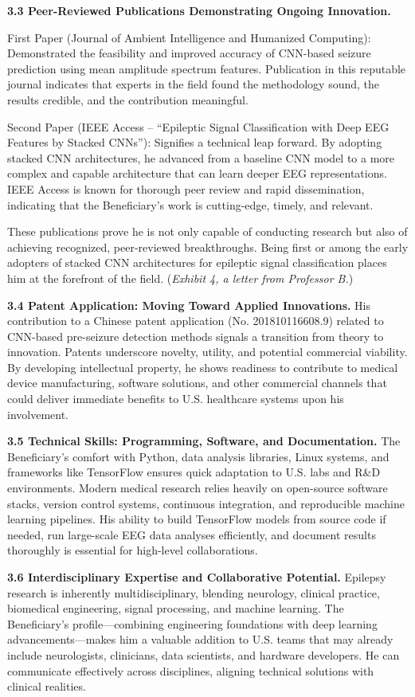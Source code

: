 \documentclass{article}
\begin{document}
{\bf 3.3 Peer-Reviewed Publications Demonstrating Ongoing Innovation.}

First Paper (Journal of Ambient Intelligence and Humanized Computing):
Demonstrated the feasibility and improved accuracy of CNN-based seizure prediction using mean amplitude spectrum features. Publication in this reputable journal indicates that experts in the field found the methodology sound, the results credible, and the contribution meaningful.

Second Paper (IEEE Access – “Epileptic Signal Classification with Deep EEG Features by Stacked CNNs”):
Signifies a technical leap forward. By adopting stacked CNN architectures, he advanced from a baseline CNN model to a more complex and capable architecture that can learn deeper EEG representations. IEEE Access is known for thorough peer review and rapid dissemination, indicating that the Beneficiary’s work is cutting-edge, timely, and relevant.

These publications prove he is not only capable of conducting research but also of achieving recognized, peer-reviewed breakthroughs. Being first or among the early adopters of stacked CNN architectures for epileptic signal classification places him at the forefront of the field. ({\it Exhibit 4, a letter from Professor B.})

{\bf 3.4 Patent Application: Moving Toward Applied Innovations.}
His contribution to a Chinese patent application (No. 201810116608.9) related to CNN-based pre-seizure detection methods signals a transition from theory to innovation. Patents underscore novelty, utility, and potential commercial viability. By developing intellectual property, he shows readiness to contribute to medical device manufacturing, software solutions, and other commercial channels that could deliver immediate benefits to U.S. healthcare systems upon his involvement.


{\bf 3.5 Technical Skills: Programming, Software, and Documentation.}
The Beneficiary’s comfort with Python, data analysis libraries, Linux systems, and frameworks like TensorFlow ensures quick adaptation to U.S. labs and R\&D environments. Modern medical research relies heavily on open-source software stacks, version control systems, continuous integration, and reproducible machine learning pipelines. His ability to build TensorFlow models from source code if needed, run large-scale EEG data analyses efficiently, and document results thoroughly is essential for high-level collaborations.


{\bf 3.6 Interdisciplinary Expertise and Collaborative Potential.}
Epilepsy research is inherently multidisciplinary, blending neurology, clinical practice, biomedical engineering, signal processing, and machine learning. The Beneficiary’s profile—combining engineering foundations with deep learning advancements—makes him a valuable addition to U.S. teams that may already include neurologists, clinicians, data scientists, and hardware developers. He can communicate effectively across disciplines, aligning technical solutions with clinical realities.
\end{document}
